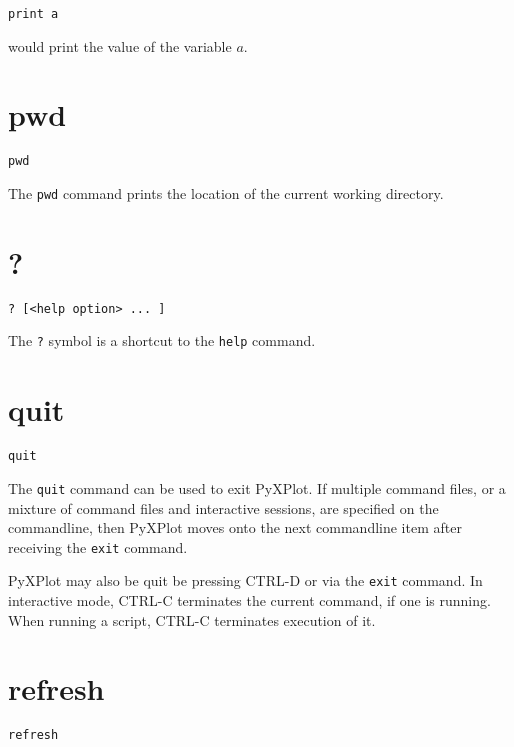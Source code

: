 \documentclass[a4paper,onecolumn,11pt]{book}
\begin{document}
\begin{verbatim}
print a
\end{verbatim}

\noindent would print the value of the variable $a$.


\section{pwd}

\begin{verbatim}
pwd
\end{verbatim}

The {\tt pwd} command prints the location of the current working directory.


\section{?}

\begin{verbatim}
? [<help option> ... ]
\end{verbatim}

The {\tt ?} symbol is a shortcut to the {\tt help} command.


\section{quit}

\begin{verbatim}
quit
\end{verbatim}

The {\tt quit} command can be used to exit PyXPlot. If multiple command files,
or a mixture of command files and interactive sessions, are specified on the
commandline, then PyXPlot moves onto the next commandline item after receiving
the {\tt exit} command.

PyXPlot may also be quit be pressing CTRL-D or via the {\tt exit} command. In
interactive mode, CTRL-C terminates the current command, if one is running.
When running a script, CTRL-C terminates execution of it.


\section{refresh}

\begin{verbatim}
refresh
\end{verbatim}
\end{document}
